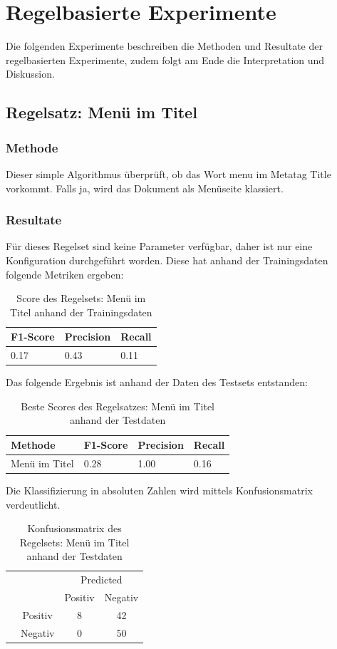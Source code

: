 \section{Regelbasierte Experimente}
Die folgenden Experimente beschreiben die Methoden und Resultate der regelbasierten Experimente, zudem folgt am Ende  die Interpretation und Diskussion.
\subsection{Regelsatz: Menü im Titel}
\subsubsection{Methode}
Dieser simple Algorithmus überprüft, ob das Wort \glqq menu\grqq{} im Metatag \glqq Title\grqq{} vorkommt.
Falls ja, wird das Dokument als Menüseite klassiert.
\subsubsection{Resultate}
Für dieses Regelset sind keine Parameter verfügbar, daher ist nur eine Konfiguration durchgeführt worden.
Diese hat anhand der Trainingsdaten folgende Metriken ergeben:\\
\begin{table}[H]
	\caption{Score des Regelsets: Menü im Titel anhand der Trainingsdaten}
	\centering
	\begin{tabular}{|l|l|l|}
		\hline
		F1-Score & Precision & Recall\\
		\hline
		0.17 & 0.43 & 0.11  \\
		\hline
	\end{tabular}
\end{table}
Das folgende Ergebnis ist anhand der Daten des Testsets entstanden:
\begin{table}[H]
	\caption{Beste Scores des Regelsatzes: Menü im Titel anhand der Testdaten}
	\centering
	\begin{tabular}{|l|l|l|l|}
		\hline
		Methode & F1-Score & Precision & Recall\\
		\hline
		Menü im Titel & 0.28 & 1.00 & 0.16 \\
		\hline
	\end{tabular}
\end{table}
Die Klassifizierung in absoluten Zahlen wird mittels Konfusionsmatrix verdeutlicht.
\begin{table}[H]
	\caption{Konfusionsmatrix des Regelsets: Menü im Titel anhand der Testdaten}
	\centering
	\begin{tabular}{@{}cc|cc@{}}
		\multicolumn{1}{c}{} &\multicolumn{1}{c}{} &\multicolumn{2}{c}{Predicted} \\ 
		\multicolumn{1}{c}{} & 
		\multicolumn{1}{c|}{} & 
		\multicolumn{1}{c}{Positiv} & 
		\multicolumn{1}{c}{Negativ} \\ 
		\cline{2-4}
		\multirow[c]{2}{*}{\rotatebox[origin=tr]{90}{Actual}}
		& Positiv  & 8   & 42   \\[1.5ex]
		& Negativ  & 0   & 50 \\ 
		\cline{2-4}
	\end{tabular}
\end{table}
